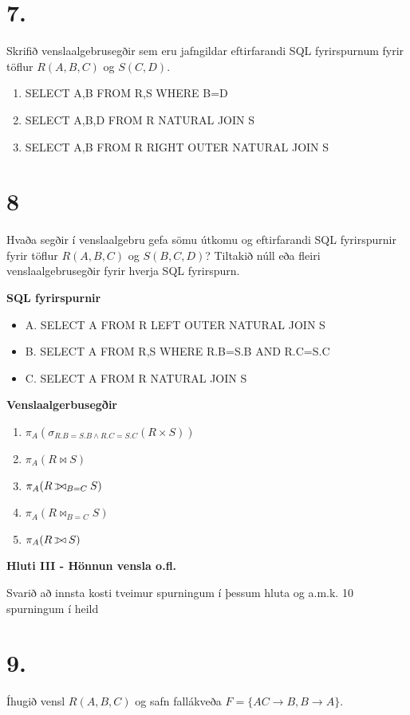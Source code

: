 \documentclass{article}
\def\ojoin{\setbox0=\hbox{$\bowtie$}%
  \rule[-.02ex]{.25em}{.4pt}\llap{\rule[\ht0]{.25em}{.4pt}}}
\def\leftouterjoin{\mathbin{\ojoin\mkern-5.8mu\bowtie}}
\newcommand{\bo}[1]{\textbf{#1}}
\newcommand{\enum}{\begin{enumerate}[label = \alph*.]}
\begin{document}
\section{7.}
Skrifið venslaalgebrusegðir sem eru jafngildar eftirfarandi SQL
fyrirspurnum fyrir töflur $R(A, B, C)$ og $S(C, D).$

\enum
\item SELECT A,B FROM R,S WHERE B=D
\item SELECT A,B,D FROM R NATURAL JOIN S
\item SELECT A,B FROM R RIGHT OUTER NATURAL JOIN S
\end{enumerate}

\vspace{1cm}

\section{8}
Hvaða segðir í venslaalgebru gefa sömu útkomu og eftirfarandi
SQL fyrirspurnir fyrir töflur $R(A, B, C)$ og $S(B, C, D)$? Tiltakið núll eða
fleiri venslaalgebrusegðir fyrir hverja SQL fyrirspurn.

\bo{SQL fyrirspurnir}
\begin{itemize}
    \item A. SELECT A FROM R LEFT OUTER NATURAL JOIN S
    \item B. SELECT A FROM R,S WHERE R.B=S.B AND R.C=S.C
    \item C. SELECT A FROM R NATURAL JOIN S
\end{itemize}
\bo{Venslaalgerbusegðir}
\enum
\item $\pi_A(\sigma_{R.B=S.B\wedge R.C=S.C}(R\times S))$
\item $\pi_A(R \bowtie S)$
\item $\pi_A(R \leftouterjoin_{B=C}S)$
\item $\pi_A(R \bowtie_{B=C}S)$
\item $\pi_A(R \leftouterjoin S)$
\end{enumerate}

\newpage

\begin{center}
    \bo{Hluti III - Hönnun vensla o.fl.}

    Svarið að innsta kosti tveimur spurningum í þessum 
    hluta og a.m.k. 10 spurningum í heild

\end{center}

\section{9.}
Íhugið vensl $R(A, B, C)$ og safn fallákveða $F = \{AC \rightarrow B, B \rightarrow A\}$.
\end{document}

